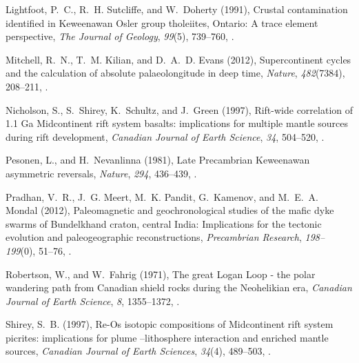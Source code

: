 \documentclass[draft,gc]{AGUTeX}
\begin{document}
\begin{article}
\begin{thebibliography}{24}
Lightfoot, P.~C., R.~H. Sutcliffe, and W.~Doherty (1991), Crustal contamination
  identified in {K}eweenawan {O}sler group tholeiites, {O}ntario: A trace
  element perspective, \textit{The Journal of Geology}, \textit{99}(5),
  739--760, .

Mitchell, R.~N., T.~M. Kilian, and D.~A.~D. Evans (2012), Supercontinent cycles
  and the calculation of absolute palaeolongitude in deep time,
  \textit{Nature}, \textit{482}(7384), 208--211, .

Nicholson, S., S.~Shirey, K.~Schultz, and J.~Green (1997), Rift-wide
  correlation of 1.1 {G}a {M}idcontinent rift system basalts: implications for
  multiple mantle sources during rift development, \textit{Canadian Journal of
  Earth Science}, \textit{34}, 504--520, .

Pesonen, L., and H.~Nevanlinna (1981), Late {P}recambrian {K}eweenawan
  asymmetric reversals, \textit{Nature}, \textit{294}, 436--439,
  .

Pradhan, V.~R., J.~G. Meert, M.~K. Pandit, G.~Kamenov, and M.~E.~A. Mondal
  (2012), Paleomagnetic and geochronological studies of the mafic dyke swarms
  of {Bundelkhand craton, central India}: Implications for the tectonic
  evolution and paleogeographic reconstructions, \textit{Precambrian Research},
  \textit{198--199}(0), 51--76, .
  
Robertson, W., and W.~Fahrig (1971), The great {L}ogan {L}oop - the polar
  wandering path from {C}anadian shield rocks during the {N}eohelikian era,
  \textit{Canadian Journal of Earth Science}, \textit{8}, 1355--1372, .

Shirey, S.~B. (1997), {Re-Os isotopic compositions of Midcontinent rift system
  picrites: implications for plume --lithosphere interaction and enriched
  mantle sources}, \textit{Canadian Journal of Earth Sciences}, \textit{34}(4),
  489--503, .
  

\end{thebibliography}
\end{article}
\end{document}
